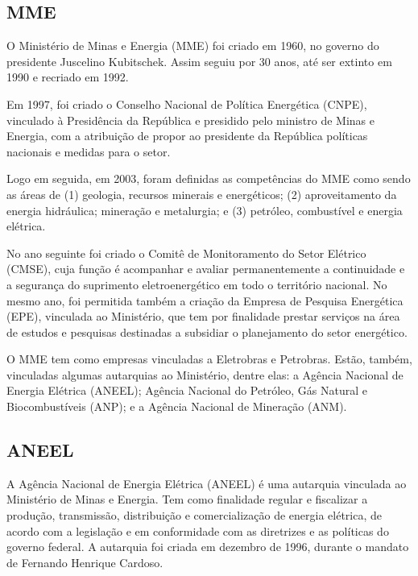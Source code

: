 \documentclass[aprovado,numbers]{coppe}
\begin{document}
  \hypertarget{mme}{%
  \subsection{MME}\label{mme}}

  O Ministério de Minas e Energia (MME) foi criado em 1960, no governo do presidente Juscelino Kubitschek. Assim seguiu por 30 anos, até ser extinto em 1990 e recriado em 1992.

  Em 1997, foi criado o Conselho Nacional de Política Energética (CNPE), vinculado à Presidência da República e presidido pelo ministro de Minas e Energia, com a atribuição de propor ao presidente da República políticas nacionais e medidas para o setor.

  Logo em seguida, em 2003, foram definidas as competências do MME como sendo as áreas de (1) geologia, recursos minerais e energéticos; (2) aproveitamento da energia hidráulica; mineração e metalurgia; e (3) petróleo, combustível e energia elétrica.

  No ano seguinte foi criado o Comitê de Monitoramento do Setor Elétrico (CMSE), cuja função é acompanhar e avaliar permanentemente a continuidade e a segurança do suprimento eletroenergético em todo o território nacional. No mesmo ano, foi permitida também a criação da Empresa de Pesquisa Energética (EPE), vinculada ao Ministério, que tem por finalidade prestar serviços na área de estudos e pesquisas destinadas a subsidiar o planejamento do setor energético.

  O MME tem como empresas vinculadas a Eletrobras e Petrobras. Estão, também, vinculadas algumas autarquias ao Ministério, dentre elas: a Agência Nacional de Energia Elétrica (ANEEL); Agência Nacional do Petróleo, Gás Natural e Biocombustíveis (ANP); e a Agência Nacional de Mineração (ANM).

  \hypertarget{aneel}{%
  \subsection{ANEEL}\label{aneel}}

  A Agência Nacional de Energia Elétrica (ANEEL) é uma autarquia vinculada ao Ministério de Minas e Energia. Tem como finalidade regular e fiscalizar a produção, transmissão, distribuição e comercialização de energia elétrica, de acordo com a legislação e em conformidade com as diretrizes e as políticas do governo federal. A autarquia foi criada em dezembro de 1996, durante o mandato de Fernando Henrique Cardoso.
\end{document}

